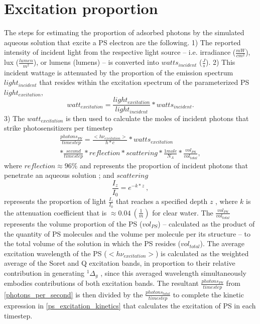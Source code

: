 \section{Excitation proportion} \label{excitation_proportion_estimate}
The steps for estimating the proportion of adsorbed photons by the simulated aqueous solution that excite a PS electron are the following. 1) The reported intensity of incident light from the respective light source -- i.e. irradiance ($\frac{mW}{cm^2}$), lux ($\frac{lumen}{m^2}$), or lumens (lumens) -- is converted into $watts_{incident}$ ($\frac{J}{s}$). 2) This incident wattage is attenuated by the proportion of the emission spectrum $light_{incident}$ that resides within the excitation spectrum of the parameterized PS $light_{excitation}$, 
\begin{equation}
    watt_{excitation} = \frac{light_{excitation}}{light_{incident}}*watts_{incident}.
\end{equation}
3) The $watt_{excitation}$ is then used to calculate the moles of incident photons that strike photosensitizers per timestep 
\begin{multline} \label{photons_per_second}
    \frac{photons_{PS}}{timestep}=\frac{<h\nu_{excitation}>}{h*c}*watts_{excitation} \\
    *\frac{second}{timestep}*reflection*scattering*\frac{1 mole}{N_A}*\frac{vol_{PS}}{vol_{total}},
\end{multline}
where $reflection \approx 96 \%$ and represents the proportion of incident photons that penetrate an aqueous solution \cite{Gross1993SingletLiposomes}; and $scattering$  
\begin{equation}
    \frac{I_z}{I_0} = e^{-k*z}~,
\end{equation}
represents the proportion of light $\frac{I_z}{I_0}$ that reaches a specified depth $z$ \cite{RobertW.1973TheSea}, where $k$ is the attenuation coefficient that is $\approx 0.04~(\frac{1}{m})$ \cite{Lorenzen1972ExtinctionPhytoplankton} for clear water. The $\frac{vol_{PS}}{vol_{total}}$ represents the volume proportion of the PS ($vol_{PS}$) -- calculated as the product of the quantity of PS molecules and the volume per molecule per its structure -- to the total volume of the solution in which the PS resides ($vol_{total}$). The average excitation wavelength of the PS ($<h\nu_{excitation}>$) is calculated as the weighted average of the Soret and Q excitation bands, in proportion to their relative contribution in generating $^1\Delta_g$ \cite{Nitzan2001PhotoinactivationWavelengths,Hoenes2020PhotoinactivationWavelength}, since this averaged wavelength simultaneously embodies contributions of both excitation bands. The resultant $\frac{photons_{PS}}{timestep}$ from \cref{photons_per_second} is then divided by the $\frac{photons_{total}}{timestep}$ to complete the kinetic expression in \cref{ps_excitation_kinetics} that calculates the excitation of PS in each timestep. 

